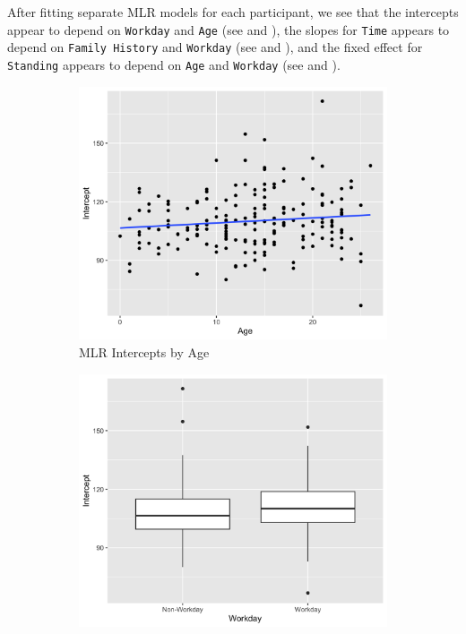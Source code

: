 \documentclass[12pt,twoside,letterpaper]{article}
\theoremstyle{definition}
\theoremstyle{definition}
\begin{document}
After fitting separate MLR models for each participant, we see that the intercepts appear to depend on \texttt{Workday} and \texttt{Age} (see  and ), the slopes for \texttt{Time} appears to depend on \texttt{Family History} and \texttt{Workday} (see  and ), and the fixed effect for \texttt{Standing} appears to depend on \texttt{Age} and \texttt{Workday} (see  and ).

\begin{figure} 
    \centering
    \begin{subfigure}[b]{0.32\textwidth}
    \centering
    \includegraphics[width=\textwidth]{pics/mlr int by age.png}
    \caption[]%
    {{\small MLR Intercepts by Age}}
    \label{fig: int v age}
    \end{subfigure}
    \hfill
    \begin{subfigure}[b]{0.32\textwidth}
    \centering
    \includegraphics[width=\textwidth]{pics/mlr int by day.png}

\end{subfigure}
\end{figure}
\end{document}
